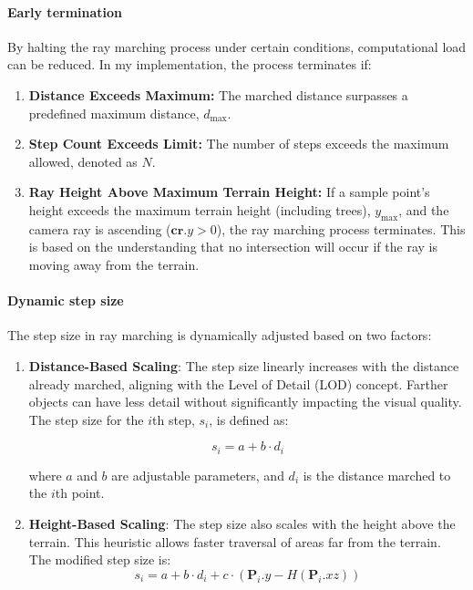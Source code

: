 \paragraph{Early termination}

By halting the ray marching process under certain conditions, computational load can be reduced. In my implementation, the process terminates if:

\begin{enumerate}
    \item \textbf{Distance Exceeds Maximum:} The marched distance surpasses a predefined maximum distance, $d_{\text{max}}$.
    \item \textbf{Step Count Exceeds Limit:} The number of steps exceeds the maximum allowed, denoted as $N$.
    \item \textbf{Ray Height Above Maximum Terrain Height:} If a sample point's height exceeds the maximum terrain height (including trees), $y_{\text{max}}$, and the camera ray is ascending ($\mathbf{cr}.y > 0$), the ray marching process terminates. This is based on the understanding that no intersection will occur if the ray is moving away from the terrain.
\end{enumerate}

\paragraph{Dynamic step size}

The step size in ray marching is dynamically adjusted based on two factors:

\begin{enumerate}
    \item \textbf{Distance-Based Scaling}: The step size linearly increases with the distance already marched, aligning with the Level of Detail (LOD) concept. Farther objects can have less detail without significantly impacting the visual quality. The step size for the $i$th step, $s_i$, is defined as:

   \begin{equation}
   s_{i} = a + b \cdot d_i
   \end{equation}
   
   where $a$ and $b$ are adjustable parameters, and $d_i$ is the distance marched to the $i$th point.

    \item \textbf{Height-Based Scaling}: The step size also scales with the height above the terrain. This heuristic allows faster traversal of areas far from the terrain. The modified step size is:
    \begin{equation}
    s_{i} = a + b \cdot d_{i} + c \cdot (\mathbf{P}_i.y - H(\mathbf{P}_i.xz))
    \end{equation}

\end{enumerate}

